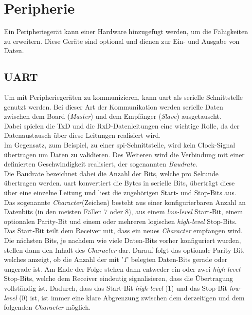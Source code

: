  \section{Peripherie}\label{kap:peripherie}
 Ein Peripheriegerät kann einer Hardware hinzugefügt werden, um die Fähigkeiten zu erweitern. Diese Geräte sind optional und dienen zur Ein- und Ausgabe von Daten.

\subsection{UART}\label{kap:uart}

Um mit Peripheriegeräten zu kommunizieren, kann \ac{uart} als serielle Schnittstelle genutzt werden.
Bei dieser Art der Kommunikation werden serielle Daten zwischen dem Board (\emph{Master})
und dem Empfänger (\emph{Slave}) ausgetauscht. \\
Dabei spielen die TxD und die RxD-Datenleitungen
eine wichtige Rolle, da der Datenaustausch über diese Leitungen realisiert wird.\\
Im Gegensatz, zum Beispiel, zu einer \ac{spi}-Schnittstelle, wird kein Clock-Signal
übertragen um Daten zu validieren. Des Weiteren wird die Verbindung mit einer definierten
Geschwindigkeit realisiert, der sogenannten \emph{Baudrate}.~\cite{uartpdf} \\
Die Baudrate bezeichnet dabei die Anzahl der Bits, welche pro Sekunde übertragen werden.
\ac{uart} konvertiert die Bytes in serielle Bits, überträgt diese über eine einzelne Leitung
und liest die zugehörigen Start- und Stop-Bits aus.\\
Das sogenannte \emph{Character}(Zeichen) besteht aus einer konfigurierbaren Anzahl an Datenbits (in den meisten
Fällen 7 oder 8), aus einem \emph{low-level} Start-Bit, einem optionalen Parity-Bit und einem
oder mehreren logischen \emph{high-level} Stop-Bits.\\
Das Start-Bit teilt dem Receiver mit, dass ein neues \emph{Character} empfangen wird.
Die nächsten Bits, je nachdem wie viele Daten-Bits vorher konfiguriert wurden, stellen
dann den Inhalt des \emph{Character} dar. Darauf folgt das optionale Parity-Bit,
welches anzeigt, ob die Anzahl der mit '\emph{1}' belegten Daten-Bits gerade oder
ungerade ist. Am Ende der Folge stehen dann entweder ein oder zwei  \emph{high-level } Stop-Bits,
welche dem Receiver eindeutig signalisieren, dass die Übertragung vollständig ist. Dadurch,
dass das Start-Bit \emph{high-level} (1) und das Stop-Bit \emph{low-level} (0) ist,
ist immer eine klare Abgrenzung zwischen dem derzeitigen und dem folgenden \emph{Character} möglich.\\


